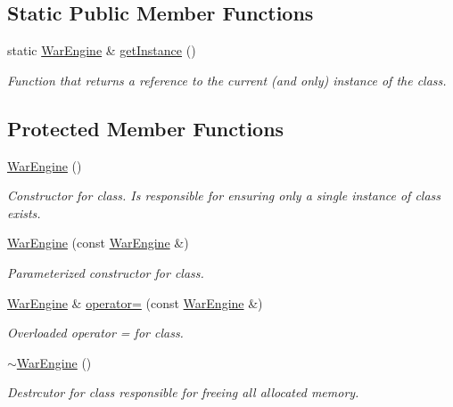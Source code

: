 \subsection*{Static Public Member Functions}
\begin{DoxyCompactItemize}
\item 
static \hyperlink{classWarEngine}{War\+Engine} \& \hyperlink{classWarEngine_aa8219fbd385bb54ad0363257915fe986}{get\+Instance} ()
\begin{DoxyCompactList}\small\item\em Function that returns a reference to the current (and only) instance of the class. \end{DoxyCompactList}\end{DoxyCompactItemize}
\subsection*{Protected Member Functions}
\begin{DoxyCompactItemize}
\item 
\mbox{\label{classWarEngine_a3c95a6990a6eabd99f1ea0ade30f85f2}} 
\hyperlink{classWarEngine_a3c95a6990a6eabd99f1ea0ade30f85f2}{War\+Engine} ()
\begin{DoxyCompactList}\small\item\em Constructor for class. Is responsible for ensuring only a single instance of class exists. \end{DoxyCompactList}\item 
\hyperlink{classWarEngine_a76af9e002be42642841c863b9d0ab710}{War\+Engine} (const \hyperlink{classWarEngine}{War\+Engine} \&)
\begin{DoxyCompactList}\small\item\em Parameterized constructor for class. \end{DoxyCompactList}\item 
\mbox{\label{classWarEngine_af57a2339eba0706693be0021719528ea}} 
\hyperlink{classWarEngine}{War\+Engine} \& \hyperlink{classWarEngine_af57a2339eba0706693be0021719528ea}{operator=} (const \hyperlink{classWarEngine}{War\+Engine} \&)
\begin{DoxyCompactList}\small\item\em Overloaded operator = for class. \end{DoxyCompactList}\item 
\mbox{\label{classWarEngine_a23425e290b562445897d4c54a80c5485}} 
\hyperlink{classWarEngine_a23425e290b562445897d4c54a80c5485}{$\sim$\+War\+Engine} ()
\begin{DoxyCompactList}\small\item\em Destrcutor for class responsible for freeing all allocated memory. \end{DoxyCompactList}\end{DoxyCompactItemize}



